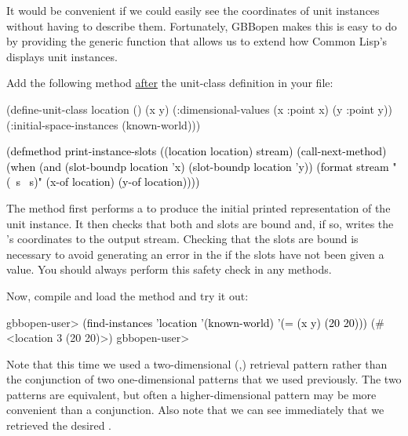 \documentclass[10pt,twoside,english,pdftex]{article}
\begin{document}
%
%
It would be convenient if we could easily see the coordinates of
 unit instances without having to describe them.
Fortunately, GBBopen makes this is easy to do by providing the
 generic function that allows us to extend
how Common Lisp's  displays 
unit instances.

Add the following  method
\underline{after} the  unit-class definition in your
 file:
%
\W\supp
\begin{example}
\textcolor{darkergray}{%
  (define-unit-class location ()
    (x y)
    (:dimensional-values
      (x :point x)
      (y :point y))
    (:initial-space-instances (known-world)))

  \textcolor{black}{(defmethod print-instance-slots ((location location) stream)
    (call-next-method)
    (when (and (slot-boundp location 'x)
               (slot-boundp location 'y))
      (format stream " (~s ~s)"
              (x-of location)
              (y-of location))))}}
\end{example}
%
The method first performs a  to produce the
initial printed representation of the  unit instance.
It then checks that both  and  slots are bound and, if so,
writes the 's coordinates to the output stream.
Checking that the slots are bound is necessary to avoid generating an error in
the  if the slots have not been given a
value.  You should always perform this safety check in any
 methods.

%
%
Now, compile and load the  method and try
it out:
%
\W\supp
\begin{example}
\textcolor{darkergray}{%
  gbbopen-user> \textcolor{black}{(find-instances 'location '(known-world)
                  '(= (x y) (20 20)))}
   (#<location 3 (20 20)>)
  gbbopen-user>}
\end{example}

Note that this time we used a two-dimensional (,) retrieval
pattern rather than the conjunction of two one-dimensional patterns that we
used previously.  The two patterns are equivalent, but often a
higher-dimensional pattern may be more convenient than a conjunction.  Also
note that we can see immediately that we retrieved the desired
.
\end{document}
